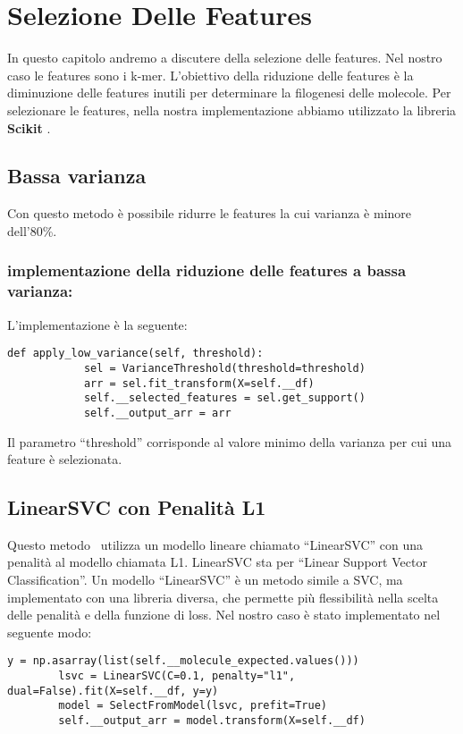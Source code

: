 \chapter{Selezione Delle Features}
\label{ch:selezionedellefeatures}

In questo capitolo andremo a discutere della selezione delle features.
Nel nostro caso le features sono i k-mer.
L'obiettivo della riduzione delle features \`e la diminuzione delle features inutili per
determinare la filogenesi delle molecole.
Per selezionare le features, nella nostra implementazione abbiamo utilizzato la libreria \textbf{Scikit }.
\section{Bassa varianza}\label{sec:low-variance}
Con questo metodo \`e possibile ridurre le features la cui varianza \`e minore dell'80\%.
\subsection{implementazione della riduzione delle features a bassa varianza:}\label{subsec:implementazione-della-riduzione-delle-features-a-bassa-varianza:}
L'implementazione \`e la seguente:
\begin{lstlisting}[label={lst:low-variance}]
        def apply_low_variance(self, threshold):
            sel = VarianceThreshold(threshold=threshold)
            arr = sel.fit_transform(X=self.__df)
            self.__selected_features = sel.get_support()
            self.__output_arr = arr
\end{lstlisting}
Il parametro ``threshold'' corrisponde al valore minimo della varianza per cui una feature \`e selezionata.
\section{LinearSVC con Penalit\`a L1}\label{sec:linearsvc-penalita-l1}
Questo metodo~\cite{l1-based} utilizza un modello lineare chiamato ``LinearSVC'' con una penalit\`a al modello chiamata L1.
LinearSVC sta per ``Linear Support Vector Classification''.
Un modello ``LinearSVC'' \`e un metodo simile a SVC, ma implementato con una libreria diversa, che permette pi\`u flessibilit\`a
nella scelta delle penalit\`a e della funzione di loss.
Nel nostro caso \`e stato implementato nel seguente modo:
\begin{lstlisting}[label={lst:l1-based}]
    y = np.asarray(list(self.__molecule_expected.values()))
        lsvc = LinearSVC(C=0.1, penalty="l1", dual=False).fit(X=self.__df, y=y)
        model = SelectFromModel(lsvc, prefit=True)
        self.__output_arr = model.transform(X=self.__df)
\end{lstlisting}
